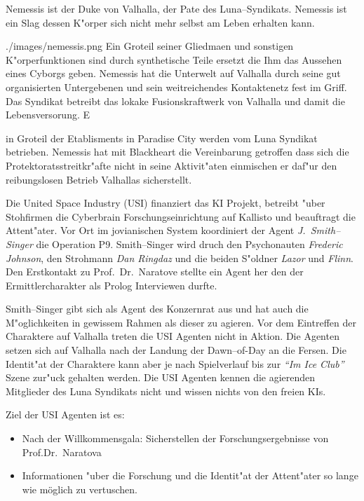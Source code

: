 Nemessis ist der Duke von Valhalla, der Pate des Luna--Syndikats. Nemessis ist ein Slag dessen K"orper sich nicht mehr selbst am Leben erhalten kann. 

\begin{sideimagebox}[r]{0.7}{./images/nemessis.png}{}
    Ein Gro\3teil seiner Gliedma\3en und sonstigen K"orperfunktionen sind durch synthetische Teile ersetzt die Ihm das Aussehen eines Cyborgs geben. Nemessis hat die Unterwelt auf Valhalla durch seine gut organisierten Untergebenen und sein weitreichendes Kontaktenetz
    fest im Griff. Das Syndikat betreibt das lokake Fusionskraftwerk von Valhalla und damit die Lebensversorung. E
\end{sideimagebox}

in Gro\3teil der Etablisments in Paradise City werden vom Luna Syndikat betrieben. Nemessis hat mit Blackheart die Vereinbarung getroffen dass sich die Protektoratsstreitkr"afte nicht in seine Aktivit"aten einmischen er daf"ur den reibungslosen Betrieb Valhallas sicherstellt.


\newpage
{}

Die United Space Industry (USI) finanziert das KI Projekt, betreibt "uber Stohfirmen die Cyberbrain Forschungseinrichtung auf Kallisto und beauftragt die Attent"ater. Vor Ort im jovianischen System koordiniert der Agent \emph{J.~Smith--Singer} die Operation P9. Smith--Singer wird druch den Psychonauten \emph{Frederic Johnson}, den Strohmann \emph{Dan Ringdaz} und die beiden S"oldner \emph{Lazor} und \emph{Flinn}. Den Erstkontakt zu Prof.~Dr.~Naratove stellte ein Agent her den der Ermittlercharakter als Prolog Interviewen durfte.

Smith--Singer gibt sich als Agent des Konzernrat aus und hat auch die M"oglichkeiten in gewissem Rahmen als dieser zu agieren. Vor dem Eintreffen der Charaktere auf Valhalla treten die USI Agenten nicht in Aktion. Die Agenten setzen sich auf Valhalla nach der Landung der Dawn--of-Day an die Fersen. Die Identit"at der Charaktere kann aber je nach Spielverlauf bis zur \emph{"`Im Ice Club"'} Szene zur"uck gehalten werden. Die USI Agenten kennen die agierenden Mitglieder des Luna Syndikats nicht und wissen nichts von den freien KIs.

Ziel der USI Agenten ist es:

\begin{itemize}
    \item Nach der Willkommensgala: Sicherstellen der Forschungsergebnisse von Prof.Dr.~Naratova
    \item Informationen "uber die Forschung und die Identit"at der Attent"ater so lange wie möglich zu vertuschen.    
\end{itemize}

